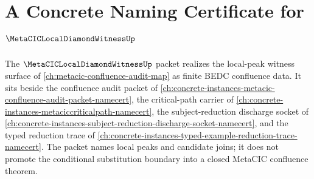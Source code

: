 \chapter{A Concrete Naming Certificate for $\MetaCICLocalDiamondWitnessUp$}
\label{ch:concrete-instances-metacic-local-diamond-witness-namecert}

The $\MetaCICLocalDiamondWitnessUp$ packet realizes the local-peak witness surface of \autoref{ch:metacic-confluence-audit-map} as finite BEDC confluence data. It sits beside the confluence audit packet of \autoref{ch:concrete-instances-metacic-confluence-audit-packet-namecert}, the critical-path carrier of \autoref{ch:concrete-instances-metaciccriticalpath-namecert}, the subject-reduction discharge socket of \autoref{ch:concrete-instances-subject-reduction-discharge-socket-namecert}, and the typed reduction trace of \autoref{ch:concrete-instances-typed-example-reduction-trace-namecert}. The packet names local peaks and candidate joins; it does not promote the conditional substitution boundary into a closed MetaCIC confluence theorem.



